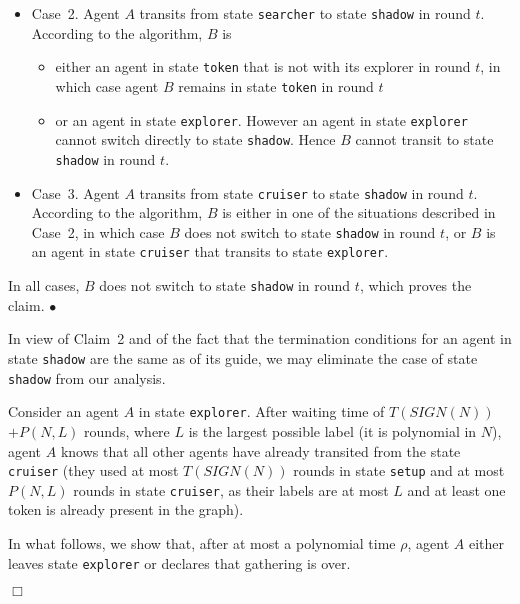 \documentclass[11pt]{article}
\newcommand{\finclaim}{\hfill $\bullet$}
\newcommand{\qed}{\hfill $\Box$ \bigbreak}
\newenvironment{proof}{\noindent {\bf Proof.}}{\qed}
\begin{document}
\begin{proof}
\begin{itemize}
\item{{Case~2.} Agent $A$ transits from state {\tt searcher} to state {\tt shadow} in round $t$. According to the algorithm, $B$ is }
\begin{itemize}
\item{ either an agent in state {\tt token} that is not with its explorer in round $t$, in which case agent $B$ remains in state {\tt token} in round $t$}
\item{ or an agent in state {\tt explorer}. However an agent in state {\tt explorer} cannot switch directly to state {\tt shadow}. Hence $B$ cannot transit to
state {\tt shadow} in round $t$. }
\end{itemize}
\item{ {Case~3.} Agent $A$ transits from state {\tt cruiser} to state {\tt shadow} in round $t$. According to the algorithm, $B$ is either in one of the situations described in Case~2, in which case $B$ does not switch to state {\tt shadow} in round $t$, or $B$ is an agent in state {\tt cruiser} that transits to state {\tt explorer}.} 
\end{itemize}

{In all cases, $B$ does not switch to state {\tt shadow} in round $t$, which proves the claim.} \finclaim

{In view of Claim~2 and of the fact that} the termination  conditions for an agent in state 
 {\tt shadow} are the same as of its guide, we may eliminate the case of state  {\tt shadow} from our analysis. 

{Consider an agent $A$ in state {\tt explorer}}. After 
  waiting time of  {$T(SIGN(N))$  $+P(N,L)$ rounds}, where $L$ is the largest possible label (it is polynomial in $N$),
 agent $A$ knows that all other agents have already transited from the state {\tt cruiser}
 (they used at most {$T(SIGN(N))$} rounds in state {\tt setup} and at most  $P(N,L)$ rounds in state  {\tt cruiser}, as their labels are at most $L$ and 
 at least one token is already present in the graph).


{In what follows, we show that, after at most a polynomial time $\rho$, agent $A$ either leaves state {\tt explorer} or declares that gathering is over.}  
 



\end{proof}
\end{document}
